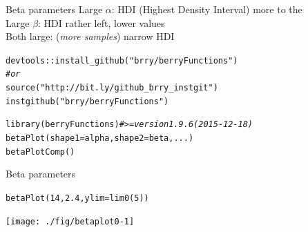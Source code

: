 \documentclass[xcolor=table,       handout,    xcolor=dvipsnames]{beamer}\usepackage[]{graphicx}\usepackage[]{color}
\makeatletter
\newcommand{\hlnum}[1]{\textcolor[rgb]{0,0,0}{#1}}
\newcommand{\hlstr}[1]{\textcolor[rgb]{0.545,0.137,0.137}{#1}}
\newcommand{\hlcom}[1]{\textcolor[rgb]{0,0.392,0}{\textit{#1}}}
\newcommand{\hlopt}[1]{\textcolor[rgb]{0,0,0}{#1}}
\newcommand{\hlstd}[1]{\textcolor[rgb]{0,0,0}{#1}}
\newcommand{\hlkwc}[1]{\textcolor[rgb]{1,0,1}{#1}}
\newcommand{\hlkwd}[1]{\textcolor[rgb]{0,0,1}{#1}}
\newenvironment{kframe}{%
 \def\at@end@of@kframe{}%
 \ifinner\ifhmode%
  \def\at@end@of@kframe{\end{minipage}}%
  \begin{minipage}{\columnwidth}%
 \fi\fi%
 \def\FrameCommand##1{\hskip\@totalleftmargin \hskip-\fboxsep
 \colorbox{shadecolor}{##1}\hskip-\fboxsep
     \hskip-\linewidth \hskip-\@totalleftmargin \hskip\columnwidth}%
 \MakeFramed {\advance\hsize-\width
   \@totalleftmargin\z@ \linewidth\hsize
   \@setminipage}}%
 {\par\unskip\endMakeFramed%
 \at@end@of@kframe}
\newenvironment{knitrout}{}{} %
\makeatother
\begin{document}
\begin{frame}[fragile]{Beta parameters}
\pause
Large $\alpha$: HDI (Highest Density Interval) more to the \\
\onslide<+-> Large $\beta$: HDI rather left, lower values\\
\onslide<+-> Both large: \onslide<+-> (\textit{more samples}) \onslide<+-> narrow HDI\\
\vspace{1.5em}
\onslide<+->
\begin{knitrout}
\color{fgcolor}\begin{kframe}
\begin{alltt}
\hlstd{devtools}\hlopt{::}\hlkwd{install_github}\hlstd{(}\hlstr{"brry/berryFunctions"}\hlstd{)}
\hlcom{# or}
\hlkwd{source}\hlstd{(}\hlstr{"http://bit.ly/github_brry_instgit"}\hlstd{)}
\hlkwd{instgithub}\hlstd{(}\hlstr{"brry/berryFunctions"}\hlstd{)}
\end{alltt}
\end{kframe}
\end{knitrout}
\onslide<+->
\begin{knitrout}
\color{fgcolor}\begin{kframe}
\begin{alltt}
\hlkwd{library}\hlstd{(berryFunctions)} \hlcom{# >= version 1.9.6 (2015-12-18)}
\hlkwd{betaPlot}\hlstd{(}\hlkwc{shape1}\hlstd{=alpha,} \hlkwc{shape2}\hlstd{=beta, ...)}
\hlkwd{betaPlotComp}\hlstd{()}
\end{alltt}
\end{kframe}
\end{knitrout}
\end{frame}


\begin{frame}[fragile]{Beta parameters}
\begin{knitrout}
\color{fgcolor}\begin{kframe}
\begin{alltt}
\hlkwd{betaPlot}\hlstd{(}\hlnum{14}\hlstd{,} \hlnum{2.4}\hlstd{,} \hlkwc{ylim}\hlstd{=}\hlkwd{lim0}\hlstd{(}\hlnum{5}\hlstd{))}
\end{alltt}
\end{kframe}

{\centering \texttt{[image: ./fig/betaplot0-1]} 

}



\end{knitrout}
\end{frame}
\end{document}
